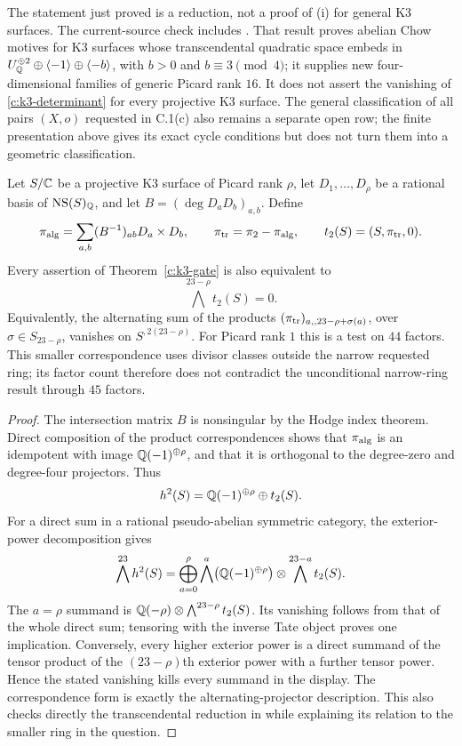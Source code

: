 The statement just proved is a reduction, not a proof of (i) for general K3 surfaces. The current-source check includes \citet[Theorem L, explicitly Theorem 9.7 and Corollary 9.8]{c_floccarifu2026}. That result proves abelian Chow motives for K3 surfaces whose transcendental quadratic space embeds in $U_\mathbb Q^{\oplus2}\oplus\langle-1\rangle\oplus\langle-b\rangle$, with $b>0$ and $b\equiv3\pmod4$; it supplies new four-dimensional families of generic Picard rank $16$. It does not assert the vanishing of \eqref{c:k3-determinant} for every projective K3 surface. The general classification of all pairs $(X,o)$ requested in C.1(c) also remains a separate open row; the finite presentation above gives its exact cycle conditions but does not turn them into a geometric classification.

\begin{corollary}
\label{c:k3-transcendental-gate}
Let $S/\mathbb C$ be a projective K3 surface of Picard rank $\rho$, let
$D_1,\ldots,D_\rho$ be a rational basis of $\operatorname{NS}(S)_\mathbb Q$,
and let $B=(\deg D_aD_b)_{a,b}$.  Define
\[
 \pi_{\rm alg}=\sum_{a,b}(B^{-1})_{ab}D_a\times D_b,
 \qquad \pi_{\rm tr}=\pi_2-\pi_{\rm alg},\qquad
 t_2(S)=(S,\pi_{\rm tr},0).
\]
Every assertion of Theorem~\ref{c:k3-gate} is also equivalent to
\[
 \bigwedge^{23-\rho}t_2(S)=0.
\]
Equivalently, the alternating sum of the products
$(\pi_{\rm tr})_{a,,23-\rho+\sigma(a)}$, over
$\sigma\in S_{23-\rho}$, vanishes on $S^{,2(23-\rho)}$.
For Picard rank $1$ this is a test on $44$ factors.  This smaller
correspondence uses divisor classes outside the narrow requested
ring; its factor count therefore does not contradict the unconditional
narrow-ring result through $45$ factors.
\end{corollary}

\begin{proof}
The intersection matrix $B$ is nonsingular by the Hodge index
theorem.  Direct composition of the product correspondences shows
that $\pi_{\rm alg}$ is an idempotent with image $\mathbb Q(-1)^{\oplus\rho}$,
and that it is orthogonal to the degree-zero and degree-four
projectors.  Thus
\[
 h^2(S)=\mathbb Q(-1)^{\oplus\rho}\oplus t_2(S).
\]
For a direct sum in a rational pseudo-abelian symmetric category,
the exterior-power decomposition gives
\[
 \bigwedge^{23}h^2(S)
 =\bigoplus_{a=0}^{\rho}
   \bigwedge^a\bigl(\mathbb Q(-1)^{\oplus\rho}\bigr)
       \otimes\bigwedge^{23-a}t_2(S).
\]
The $a=\rho$ summand is
$\mathbb Q(-\rho)\otimes\bigwedge^{23-\rho}t_2(S)$.
Its vanishing follows from that of the whole direct sum; tensoring
with the inverse Tate object proves one implication.
Conversely, every higher exterior power is a direct summand of
the tensor product of the $(23-\rho)$th exterior power with a
further tensor power.  Hence the stated vanishing kills every
summand in the display.  The correspondence form is exactly the
alternating-projector description.  This also checks directly the
transcendental reduction in \citet[\S2.5, pp.~506--507, equation~(7)]{c_yin2015}
while explaining its relation to the smaller ring in the question.
\end{proof}



